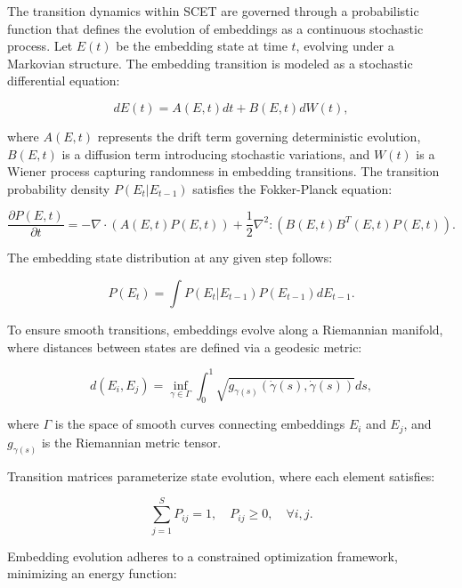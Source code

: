 \documentclass{article}
\begin{document}
The transition dynamics within SCET are governed through a probabilistic function that defines the evolution of embeddings as a continuous stochastic process. Let \( E(t) \) be the embedding state at time \( t \), evolving under a Markovian structure. The embedding transition is modeled as a stochastic differential equation:

\begin{equation}
	dE(t) = A(E, t) dt + B(E, t) dW(t),
\end{equation}

where \( A(E, t) \) represents the drift term governing deterministic evolution, \( B(E, t) \) is a diffusion term introducing stochastic variations, and \( W(t) \) is a Wiener process capturing randomness in embedding transitions. The transition probability density \( P(E_t | E_{t-1}) \) satisfies the Fokker-Planck equation:

\begin{equation}
	\frac{\partial P(E,t)}{\partial t} = -\nabla \cdot \left(A(E,t) P(E,t)\right) + \frac{1}{2} \nabla^2 : \left( B(E,t) B^T(E,t) P(E,t) \right).
\end{equation}

The embedding state distribution at any given step follows:

\begin{equation}
	P(E_t) = \int P(E_t | E_{t-1}) P(E_{t-1}) dE_{t-1}.
\end{equation}

To ensure smooth transitions, embeddings evolve along a Riemannian manifold, where distances between states are defined via a geodesic metric:

\begin{equation}
	d(E_i, E_j) = \inf_{\gamma \in \Gamma} \int_0^1 \sqrt{g_{\gamma(s)} \left( \dot{\gamma}(s), \dot{\gamma}(s) \right)} ds,
\end{equation}

where \( \Gamma \) is the space of smooth curves connecting embeddings \( E_i \) and \( E_j \), and \( g_{\gamma(s)} \) is the Riemannian metric tensor.

Transition matrices parameterize state evolution, where each element satisfies:

\begin{equation}
	\sum_{j=1}^{S} P_{ij} = 1, \quad P_{ij} \geq 0, \quad \forall i,j.
\end{equation}

Embedding evolution adheres to a constrained optimization framework, minimizing an energy function:
\end{document}
